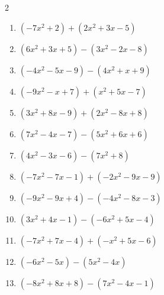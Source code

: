\begin{multicols}{2}
\begin{enumerate}
        \phantom{$=-9x-9$}

  \item $(-7x^{2}+2)+(2x^{2}+3x-5)$


  \item $(6x^{2}+3x+5)-(3x^{2}-2x-8)$


  \item $(-4x^{2}-5x-9)-(4x^{2}+x+9)$


  \item $(-9x^{2}-x+7)+(x^{2}+5x-7)$


  \item $(3x^{2}+8x-9)+(2x^{2}-8x+8)$


  \item $(7x^{2}-4x-7)-(5x^{2}+6x+6)$


  \item $(4x^{2}-3x-6)-(7x^{2}+8)$


  \item $(-7x^{2}-7x-1)+(-2x^{2}-9x-9)$


  \item $(-9x^{2}-9x+4)-(-4x^{2}-8x-3)$


  \item $(3x^{2}+4x-1)-(-6x^{2}+5x-4)$


  \item $(-7x^{2}+7x-4)+(-x^{2}+5x-6)$


  \item $(-6x^{2}-5x)-(5x^{2}-4x)$


\columnbreak %

\resetques

  \item $(-8x^{2}+8x+8)-(7x^{2}-4x-1)$


\end{enumerate}
\end{multicols}
